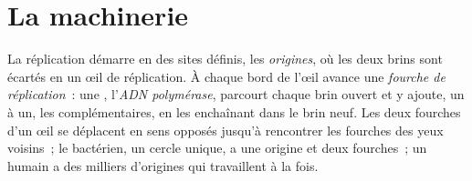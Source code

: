 \section{La machinerie}

\begin{proposition}\label{prop:g11:dna-replication:forks}
La réplication démarre en des sites définis, les \emph{origines}, où
les deux brins sont écartés en un œil de réplication. À chaque bord de
l'œil avance une \emph{fourche de réplication}~:
une , l'\emph{ADN polymérase}, parcourt
chaque brin ouvert et y ajoute, un à un, les 
complémentaires, en les enchaînant dans le brin neuf. Les deux fourches
d'un œil se déplacent en sens opposés jusqu'à rencontrer les fourches
des yeux voisins~; le  bactérien, un cercle unique, a une
origine et deux fourches~; un  humain a des milliers
d'origines qui travaillent à la fois.
\end{proposition}
\admitted

